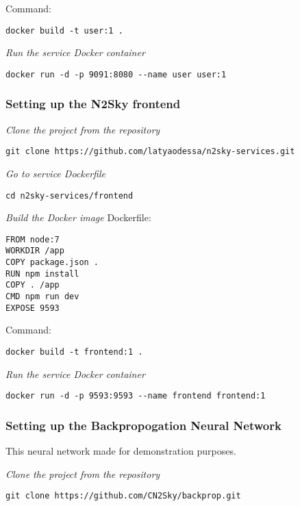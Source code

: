 Command: 

 \begin{lstlisting}
docker build -t user:1 .
\end{lstlisting}


\emph{Run the service Docker container}
 \begin{lstlisting}
docker run -d -p 9091:8080 --name user user:1
\end{lstlisting}



\subsubsection{Setting up the N2Sky frontend}\label{frontend setup}

\emph{Clone the project from the repository}
 \begin{lstlisting}
git clone https://github.com/latyaodessa/n2sky-services.git 
\end{lstlisting}

\emph{Go to service Dockerfile}
 \begin{lstlisting}
cd n2sky-services/frontend
\end{lstlisting}

\emph{Build the Docker image}
Dockerfile:
 \begin{lstlisting}
FROM node:7
WORKDIR /app
COPY package.json .
RUN npm install
COPY . /app
CMD npm run dev
EXPOSE 9593
\end{lstlisting}

Command:
 \begin{lstlisting}
docker build -t frontend:1 .
\end{lstlisting}


\emph{Run the service Docker container}
 \begin{lstlisting}
docker run -d -p 9593:9593 --name frontend frontend:1
\end{lstlisting}





\subsubsection{Setting up the Backpropogation Neural Network}\label{backprop setup}

This neural network made for demonstration purposes. 

\emph{Clone the project from the repository}
 \begin{lstlisting}
git clone https://github.com/CN2Sky/backprop.git
\end{lstlisting}

